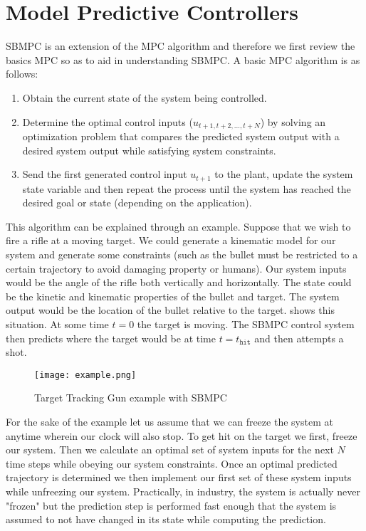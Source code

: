 \documentclass[main.tex]{subfile}
\begin{document}
\section{Model Predictive Controllers} 
\label{sec:sbmpc}

SBMPC is an extension of the MPC algorithm and therefore we first review the
basics MPC so as to aid in understanding SBMPC. A basic MPC algorithm is as
follows\cite{autoVehicle}:

\begin{enumerate}
	\item Obtain the current state of the system being controlled.
	\item Determine the optimal control inputs ($u_{t+1,t+2,...,t+N}$) by solving
		an optimization problem that compares the predicted system output with a
		desired system output while satisfying system constraints.
	\item Send the first generated control input $u_{t+1}$ to the plant, update
		the system state variable and then repeat the process until the system has
		reached the desired goal or state (depending on the application).
\end{enumerate}

This algorithm can be explained through an example. Suppose that we wish to fire
a rifle at a moving target. We could generate a kinematic model for our system
and generate some constraints (such as the bullet must be restricted to a
certain trajectory to avoid damaging property or humans). Our system inputs
would be the angle of the rifle both vertically and horizontally. The state
could be the kinetic and kinematic properties of the bullet and target. The
system output would be the location of the bullet relative to the target.
 shows this situation. At some time $t=0$ the target is moving.
The SBMPC control system then predicts where the target would be at time
$t=t_{\texttt{hit}}$ and then attempts a shot. 

\begin{figure}[H]
	\begin{center}
		\texttt{[image: example.png]}
	\end{center}
	\caption{Target Tracking Gun example with SBMPC}
	\label{fig:example}
\end{figure}

For the sake of the example let us assume that we can freeze the system at
anytime wherein our clock will also stop. To get hit on the target we first,
freeze our system. Then we calculate an optimal set of system inputs for the
next $N$ time steps while obeying our system constraints. Once an optimal
predicted trajectory is determined we then implement our first set of these
system inputs while unfreezing our system. Practically, in industry, the system
is actually never "frozen" but the prediction step is performed fast enough that
the system is assumed to not have changed in its state while computing the
prediction.
\end{document}
